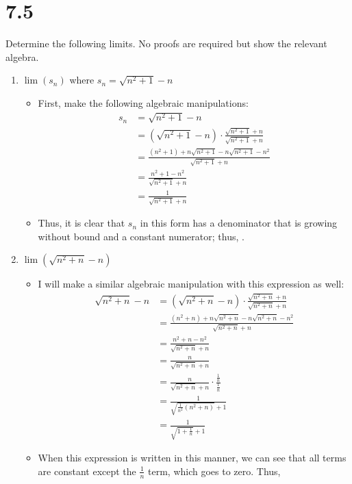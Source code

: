 \documentclass[10pt,a4paper]{article}
\theoremstyle{definition}
\begin{document}
\section*{7.5}
Determine the following limits. No proofs are required but show the relevant algebra.
\begin{enumerate}[label = (\alph*)]
\item $\lim(s_n)$ where $s_n = \sqrt{n^2 + 1} - n$
	\begin{itemize}
	\item First, make the following algebraic manipulations:
	\begin{align*}
	s_n &= \sqrt{n^2 + 1} - n\\
	&= \left(\sqrt{n^2 + 1} - n\right)\cdot \frac{\sqrt{n^2 + 1}+n}{\sqrt{n^2 + 1}+n}\\
	&= \frac{(n^2 + 1) + n\sqrt{n^2 + 1} - n\sqrt{n^2 + 1} - n^2}{\sqrt{n^2 + 1}+n}\\
	&= \frac{n^2 + 1 - n^2}{\sqrt{n^2 + 1}+n}\\
	&= \frac{1}{\sqrt{n^2 + 1}+n}
	\end{align*}
	\item Thus, it is clear that $s_n$ in this form has a denominator that is growing without bound and a constant numerator; thus, .
	\end{itemize}
\item $\lim(\sqrt{n^2 + n} - n)$
	\begin{itemize}
	\item I will make a similar algebraic manipulation with this expression as well:
	\begin{align*}
	\sqrt{n^2 + n}-n &= \left(\sqrt{n^2 + n}-n\right) \cdot \frac{\sqrt{n^2 + n}+n}{\sqrt{n^2 + n}+n}\\
	&= \frac{(n^2 + n) + n\sqrt{n^2 + n} - n\sqrt{n^2 + n} - n^2}{\sqrt{n^2 + n}+n}\\
	&= \frac{n^2 + n - n^2}{\sqrt{n^2 + n}+n}\\
	&= \frac{n}{\sqrt{n^2 + n}+n}\\
	&= \frac{n}{\sqrt{n^2 + n}+n} \cdot \frac{\frac{1}{n}}{\frac{1}{n}}\\
	&= \frac{1}{\sqrt{\frac{1}{n^2}(n^2 + n)} + 1}\\
	&= \frac{1}{\sqrt{1 + \frac{1}{n}} + 1}
	\end{align*}
	\item When this expression is written in this manner, we can see that all terms are constant except the $\displaystyle \frac{1}{n}$ term, which goes to zero. Thus, 

\end{itemize}
\end{enumerate}
\end{document}
